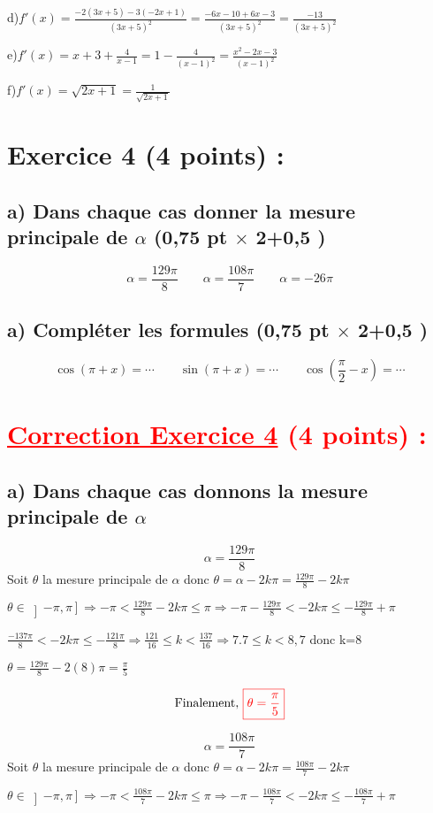 \documentclass[12pt]{article}
\begin{document}
d)$f'(x)=\frac{-2(3x+5)-3(-2x+1)}{(3x+5)^{2}}=\frac{-6x-10+6x-3}{(3x+5)^{2}}=\frac{-13}{(3x+5)^{2}}$

e)$f'(x)=x+3+\frac{4}{x-1}=1-\frac{4}{(x-1)^{2}}=\frac{x^{2}-2x-3}{(x-1)^{2}}$

f)$f'(x)=\sqrt{2x+1}=\frac{1}{\sqrt{2x+1}}$
\section*{Exercice 4 (4 points) :}
\subsection*{a) Dans chaque cas donner la mesure principale de $\alpha$ (0,75 pt $\times$ 2+0,5 )}
\[\alpha =\frac{129\pi}{8}\quad\quad \alpha =\frac{108\pi}{7}\quad\quad \alpha = -26\pi \]
\subsection*{a) Compléter les formules (0,75 pt $\times$ 2+0,5 )}
\[\cos(\pi+x)=\cdots\quad\quad \sin(\pi+x)=\cdots\quad\quad \cos(\frac{\pi}{2}-x)=\cdots\]
\section*{\textcolor{red}{\underline{Correction Exercice 4} (4 points) :}}
\subsection*{a) Dans chaque cas donnons la mesure principale de $\alpha$}
\[\alpha =\frac{129\pi}{8} \]
Soit $\theta$ la mesure principale de $\alpha$ donc $\theta=\alpha-2k\pi=\frac{129\pi}{8}-2k\pi$ 

$\theta \in \left]-\pi, \pi\right]\Rightarrow -\pi<\frac{129\pi}{8}-2k\pi\leq \pi \Rightarrow -\pi-\frac{129\pi}{8}<-2k\pi\leq-\frac{129\pi}{8}+\pi$ 

$\frac{-137\pi}{8}<-2k\pi\leq-\frac{121\pi}{8} \Rightarrow \frac{121}{16}\leq k <\frac{137}{16} \Rightarrow 7.7\leq k <8,7  $ donc k=8

$\theta=\frac{129\pi}{8}-2(8)\pi=\frac{\pi}{5}$ 

\[\text{Finalement, }\textcolor{red}{\boxed{\theta=\frac{\pi}{5}}}\] 

\[\alpha =\frac{108\pi}{7} \]
Soit $\theta$ la mesure principale de $\alpha$ donc $\theta=\alpha-2k\pi=\frac{108\pi}{7}-2k\pi$ 

$\theta \in \left]-\pi, \pi\right]\Rightarrow -\pi<\frac{108\pi}{7}-2k\pi\leq \pi \Rightarrow -\pi-\frac{108\pi}{7}<-2k\pi\leq-\frac{108\pi}{7}+\pi$ 
\end{document}
